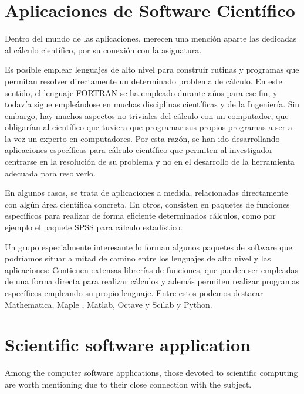 \begin{paracol}{2}
 \section{Aplicaciones de Software Científico}
Dentro del mundo de las aplicaciones, merecen una mención aparte las dedicadas al cálculo científico, por su conexión con la asignatura. 

Es posible emplear lenguajes de alto nivel para construir rutinas y programas que permitan resolver directamente un determinado problema de cálculo. En este sentido, el lenguaje FORTRAN se ha empleado durante años para ese fin, y todavía sigue empleándose en muchas disciplinas científicas y de la Ingeniería.  Sin embargo, hay muchos aspectos no triviales del cálculo con un computador, que obligarían al científico que tuviera que programar sus propios programas a ser a la vez un experto en computadores.  Por esta razón, se han ido desarrollando aplicaciones específicas para cálculo científico que permiten al investigador centrarse en la resolución de su problema y no en el desarrollo de la herramienta adecuada para resolverlo.  
 
En algunos casos, se trata de aplicaciones a medida, relacionadas directamente con algún área científica concreta. En otros, consisten en paquetes de funciones específicos para realizar de forma eficiente determinados cálculos, como por ejemplo
el paquete SPSS para cálculo estadístico.

Un grupo especialmente interesante lo forman algunos paquetes de software que podríamos situar a mitad de camino entre los lenguajes de alto nivel y las aplicaciones: Contienen extensas librerías de funciones, que pueden ser empleadas de una forma directa para realizar cálculos y además permiten realizar programas específicos empleando su propio lenguaje. Entre estos podemos destacar Mathematica, Maple , Matlab, Octave y Scilab y Python. 
\switchcolumn

\section{Scientific software application}

Among the computer software applications, those devoted to scientific computing are worth mentioning due to their close connection with the subject.


\end{paracol}
